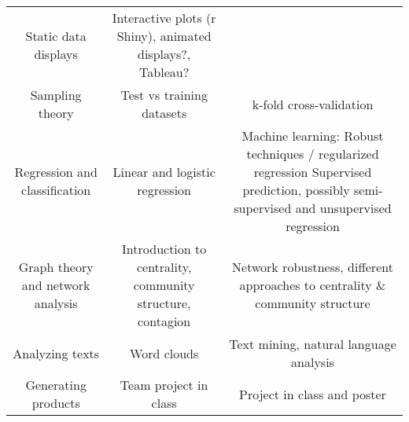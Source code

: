 \documentclass[]{book}
\theoremstyle{definition}
\theoremstyle{definition}
\theoremstyle{definition}
\theoremstyle{remark}
\begin{document}
\begin{longtable}[]{@{}ccc@{}}
\begin{minipage}[t]{0.30\columnwidth}
Static data displays\strut
\end{minipage} & \begin{minipage}[t]{0.30\columnwidth}\centering
Interactive plots (r Shiny), animated displays?, Tableau?\strut
\end{minipage}\tabularnewline
\begin{minipage}[t]{0.30\columnwidth}\centering
Sampling theory\strut
\end{minipage} & \begin{minipage}[t]{0.30\columnwidth}\centering
Test vs training datasets\strut
\end{minipage} & \begin{minipage}[t]{0.30\columnwidth}\centering
k-fold cross-validation\strut
\end{minipage}\tabularnewline
\begin{minipage}[t]{0.30\columnwidth}\centering
Regression and classification\strut
\end{minipage} & \begin{minipage}[t]{0.30\columnwidth}\centering
Linear and logistic regression\strut
\end{minipage} & \begin{minipage}[t]{0.30\columnwidth}\centering
Machine learning: Robust techniques / regularized regression Supervised
prediction, possibly semi-supervised and unsupervised regression\strut
\end{minipage}\tabularnewline
\begin{minipage}[t]{0.30\columnwidth}\centering
Graph theory and network analysis\strut
\end{minipage} & \begin{minipage}[t]{0.30\columnwidth}\centering
Introduction to centrality, community structure, contagion\strut
\end{minipage} & \begin{minipage}[t]{0.30\columnwidth}\centering
Network robustness, different approaches to centrality \& community
structure\strut
\end{minipage}\tabularnewline
\begin{minipage}[t]{0.30\columnwidth}\centering
Analyzing texts\strut
\end{minipage} & \begin{minipage}[t]{0.30\columnwidth}\centering
Word clouds\strut
\end{minipage} & \begin{minipage}[t]{0.30\columnwidth}\centering
Text mining, natural language analysis\strut
\end{minipage}\tabularnewline
\begin{minipage}[t]{0.30\columnwidth}\centering
Generating products\strut
\end{minipage} & \begin{minipage}[t]{0.30\columnwidth}\centering
Team project in class\strut
\end{minipage} & \begin{minipage}[t]{0.30\columnwidth}\centering
Project in class and poster\strut
\end{minipage}\tabularnewline
\bottomrule
\end{longtable}


\end{document}
